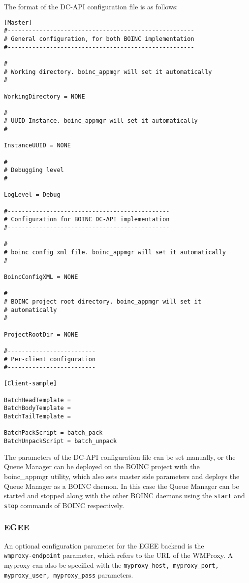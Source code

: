 \documentclass[a4paper, 12pt]{article}
\begin{document}
The format of the DC-API configuration file is as follows:

\begin{verbatim}
[Master]
#-----------------------------------------------------
# General configuration, for both BOINC implementation
#-----------------------------------------------------

#
# Working directory. boinc_appmgr will set it automatically
#

WorkingDirectory = NONE

#
# UUID Instance. boinc_appmgr will set it automatically
#

InstanceUUID = NONE

#
# Debugging level
#

LogLevel = Debug

#----------------------------------------------
# Configuration for BOINC DC-API implementation
#----------------------------------------------

#
# boinc config xml file. boinc_appmgr will set it automatically
#

BoincConfigXML = NONE

#
# BOINC project root directory. boinc_appmgr will set it 
# automatically
#

ProjectRootDir = NONE

#-------------------------
# Per-client configuration
#-------------------------

[Client-sample]

BatchHeadTemplate =
BatchBodyTemplate =
BatchTailTemplate =

BatchPackScript = batch_pack
BatchUnpackScript = batch_unpack
\end{verbatim}
The parameters of the DC-API configuration file can be set manually, or the Queue Manager can be deployed on the BOINC project with the \\ boinc\_appmgr utility, which also sets master side parameters and deploys the Queue Manager as a BOINC daemon. In this case the Queue Manager can be started and stopped along with the other BOINC daemons using the {\tt start} and {\tt stop} commands of BOINC respectively. 

\subsubsection{EGEE}

An optional configuration parameter for the EGEE backend is the \\ {\tt wmproxy-endpoint} parameter, which refers to the URL of the WMProxy. A myproxy can also be specified with the {\tt myproxy\_host, myproxy\_port, myproxy\_user, myproxy\_pass} parameters.
\end{document}
